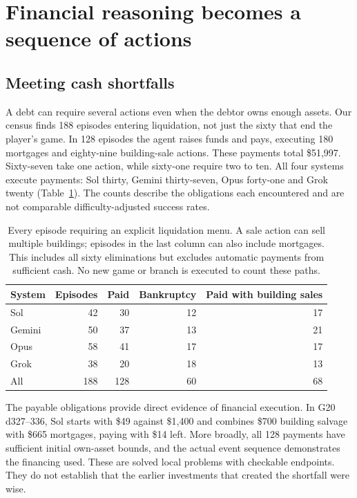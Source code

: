 \section{Financial reasoning becomes a sequence of actions}
\label{sec:execution}

\subsection{Meeting cash shortfalls}

A debt can require several actions even when the debtor owns enough assets. Our census finds 188 episodes entering liquidation, not just the sixty that end the player's game. In 128 episodes the agent raises funds and pays, executing 180 mortgages and eighty-nine building-sale actions. These payments total \$51,997. Sixty-seven take one action, while sixty-one require two to ten. All four systems execute payments: Sol thirty, Gemini thirty-seven, Opus forty-one and Grok twenty (Table~\ref{tab:liquidation}). The counts describe the obligations each encountered and are not comparable difficulty-adjusted success rates.

\begin{table}[t]\centering\small
\begin{tabular}{@{}lrrrr@{}}\toprule
System & Episodes & Paid & Bankruptcy & Paid with building sales\\\midrule
Sol&42&30&12&17\\
Gemini&50&37&13&21\\
Opus&58&41&17&17\\
Grok&38&20&18&13\\\midrule
All&188&128&60&68\\\bottomrule
\end{tabular}
\caption{Every episode requiring an explicit liquidation menu. A sale action can sell multiple buildings; episodes in the last column can also include mortgages. This includes all sixty eliminations but excludes automatic payments from sufficient cash. No new game or branch is executed to count these paths.}
\label{tab:liquidation}\end{table}

The payable obligations provide direct evidence of financial execution. In G20 d327--336, Sol starts with \$49 against \$1,400 and combines \$700 building salvage with \$665 mortgages, paying with \$14 left. More broadly, all 128 payments have sufficient initial own-asset bounds, and the actual event sequence demonstrates the financing used. These are solved local problems with checkable endpoints. They do not establish that the earlier investments that created the shortfall were wise.

